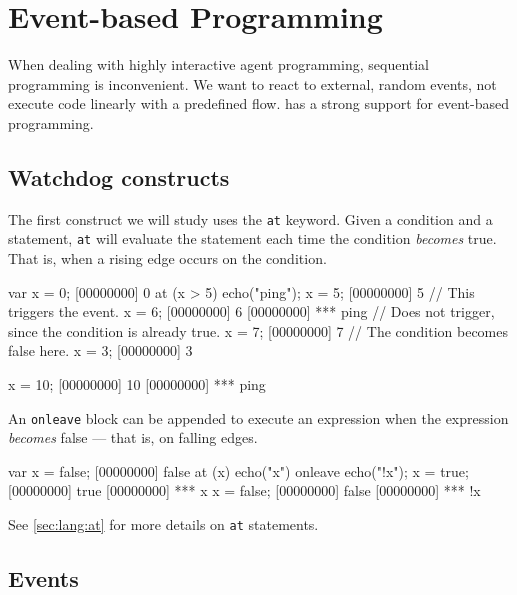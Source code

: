 
\chapter{Event-based Programming}
\label{sec:tut:event-prog}

When dealing with highly interactive agent programming, sequential
programming is inconvenient. We want to react to external, random
events, not execute code linearly with a predefined flow. \us has a
strong support for event-based programming.

\section{Watchdog constructs}

The first construct we will study uses the \lstinline|at| keyword. Given a
condition and a statement, \lstinline|at| will evaluate the statement each
time the condition \emph{becomes} true. That is, when a rising edge occurs
on the condition.

\begin{urbiscript}[firstnumber=1]
var x = 0;
[00000000] 0
at (x > 5)
  echo("ping");
x = 5;
[00000000] 5
// This triggers the event.
x = 6;
[00000000] 6
[00000000] *** ping
// Does not trigger, since the condition is already true.
x = 7;
[00000000] 7
// The condition becomes false here.
x = 3;
[00000000] 3

x = 10;
[00000000] 10
[00000000] *** ping
\end{urbiscript}

An \lstinline|onleave| block can be appended to execute an expression when
the expression \emph{becomes} false --- that is, on falling edges.

\begin{urbiscript}[firstnumber=1]
var x = false;
[00000000] false
at (x)
  echo("x")
onleave
  echo("!x");
x = true;
[00000000] true
[00000000] *** x
x = false;
[00000000] false
[00000000] *** !x
\end{urbiscript}

See \autoref{sec:lang:at} for more details on \lstinline|at| statements.



\section{Events}
\label{sec:tut:events}

